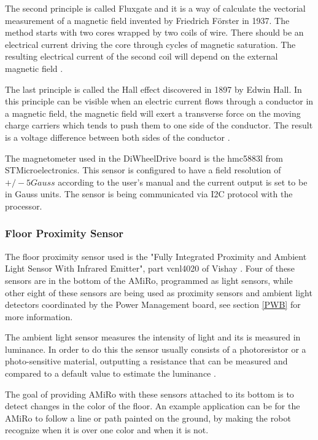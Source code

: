 \documentclass[12pt]{report}%
\begin{document}
The second principle is called Fluxgate and it is a way of calculate the vectorial measurement of a magnetic field invented by Friedrich Förster in 1937. The method starts with two cores wrapped by two coils of wire. There should be an electrical current driving the core through cycles of magnetic saturation. The resulting electrical current of the second coil will depend on the external magnetic field \cite{AMiRo_ppt_v1}.

The last principle is called the Hall effect discovered in 1897 by Edwin Hall. In this principle can be visible when an electric current flows through a conductor in a magnetic field, the magnetic field will exert a transverse force on the moving charge carriers which tends to push them to one side of the conductor. The result is a voltage difference between both sides of the conductor \cite{halleffect}.

The magnetometer used in the DiWheelDrive board is the hmc5883l from STMicroelectronics. This sensor is configured to have a field resolution of $+/-5Gauss$ according to the user's manual \cite{magnetometerpart} and the current output is set to be in Gauss units. The sensor is being communicated via I2C protocol with the processor.

\subsubsection{Floor Proximity Sensor}
\label{sec:AMS}
The floor proximity sensor used is the "Fully Integrated Proximity and Ambient Light Sensor With Infrared Emitter", part vcnl4020 of Vishay \cite{proxsensor}. Four of these sensors are in the bottom of the AMiRo, programmed as light sensors, while other eight of these sensors are being used as proximity sensors and ambient light detectors coordinated by the Power Management board, see section \ref{PWB} for more information.

The ambient light sensor measures the intensity of light and its is measured in luminance. In order to do this the sensor usually consists of a photoresistor or a photo-sensitive material, outputting a resistance that can be measured and compared to a default value to estimate the luminance \cite{amstheory}.

The goal of providing AMiRo with these sensors attached to its bottom is to detect changes in the color of the floor. An example application can be for the AMiRo to follow a line or path painted on the ground, by making the robot recognize when it is over one color and when it is not.
\end{document}
